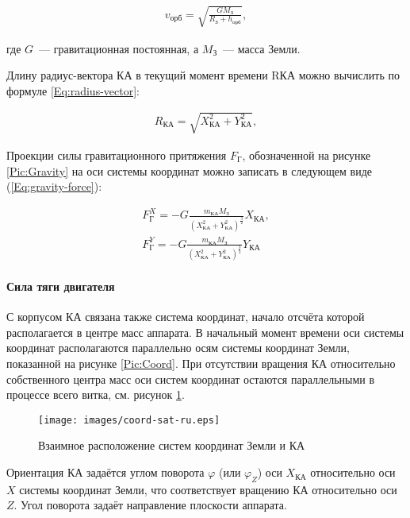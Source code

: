 \documentclass[12pt,a4paper]{article}
\begin{document}
\begin{eqnarray}
  v_{\text{орб}} = \sqrt{\frac{G M_{\text{З}}}{R_{\text{З}} + h_{\text{орб}}}}, \label{Eq:orbital-velocity}
\end{eqnarray}

где $G$~--- гравитационная постоянная, а $M_{\text{З}}$~--- масса Земли.

Длину радиус-вектора КА в текущий момент времени RКА можно вычислить по формуле
\ref{Eq:radius-vector}:

\begin{eqnarray}
  R_{\text{КА}} = \sqrt{X_{\text{КА}}^2 + Y_{\text{КА}}^2}, \label{Eq:radius-vector}
\end{eqnarray}

Проекции силы гравитационного притяжения $F_{\text{Г}}$, обозначенной на рисунке
\ref{Pic:Gravity} на оси системы координат можно записать в следующем виде
(\ref{Eq:gravity-force}):

\begin{eqnarray}
  F_{\text{Г}}^X = - G \frac{m_{\text{КА}} M_{\text{З}}}{\left(X_{\text{КА}}^2 +
    Y_{\text{КА}}^2\right)^{\frac{3}{2}}} X_{\text{КА}}, \nonumber \\
  F_{\text{Г}}^Y = - G \frac{m_{\text{КА}} M_{\text{З}}}{\left(X_{\text{КА}}^2 +
    Y_{\text{КА}}^2\right)^{\frac{3}{2}}} Y_{\text{КА}} \label{Eq:gravity-force}
\end{eqnarray}

\paragraph{Сила тяги двигателя} 

С корпусом КА связана также система координат, начало отсчёта которой располагается в
центре масс аппарата. В начальный момент времени оси системы координат располагаются
параллельно осям системы координат Земли, показанной на рисунке \ref{Pic:Coord}. При
отсутствии вращения КА относительно собственного центра масс оси систем координат остаются
параллельными в процессе всего витка, см. рисунок \ref{Pic:Coord-Sat}.

\begin{figure}[tbh]
  \begin{center}
    \texttt{[image: images/coord-sat-ru.eps]}
    \caption{Взаимное расположение систем координат Земли и КА}
    \label{Pic:Coord-Sat}
  \end{center}
\end{figure}

Ориентация КА задаётся углом поворота $\varphi$ (или $\varphi_Z$) оси $X_{\text{КА}}$ относительно оси $X$ системы координат
Земли, что соответствует вращению КА относительно оси $Z$. Угол поворота задаёт направление
плоскости аппарата.
\end{document}
